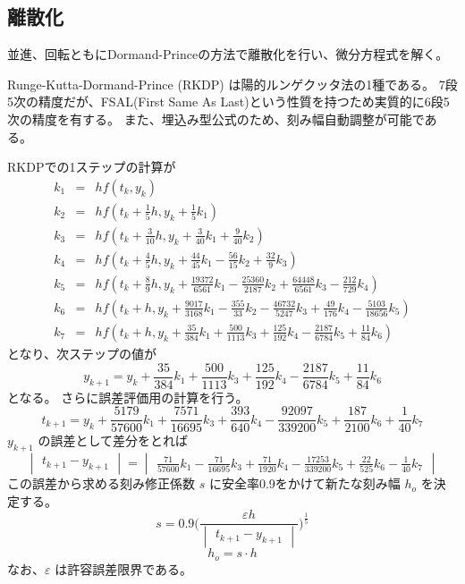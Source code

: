 ﻿\documentclass[a4paper]{jsarticle}
\begin{document}
\subsection{離散化}
並進、回転ともにDormand-Princeの方法で離散化を行い、微分方程式を解く。

Runge-Kutta-Dormand-Prince (RKDP) は陽的ルンゲクッタ法の1種である。
7段5次の精度だが、FSAL(First Same As Last)という性質を持つため実質的に6段5次の精度を有する。
また、埋込み型公式のため、刻み幅自動調整が可能である。

RKDPでの1ステップの計算が
\begin{eqnarray}
k_1 &=& hf(t_k, y_k) \\
k_2 &=& hf(t_k + \frac{1}{5}h, y_k + \frac{1}{5}k_1) \\
k_3 &=& hf(t_k + \frac{3}{10}h, y_k + \frac{3}{40}k_1 + \frac{9}{40}k_2) \\
k_4 &=& hf(t_k + \frac{4}{5}h, y_k + \frac{44}{45}k_1 - \frac{56}{15}k_2 + \frac{32}{9}k_3) \\
k_5 &=& hf(t_k + \frac{8}{9}h, y_k + \frac{19372}{6561}k_1 - \frac{25360}{2187}k_2 + \frac{64448}{6561}k_3 - \frac{212}{729}k_4) \\
k_6 &=& hf(t_k + h, y_k + \frac{9017}{3168}k_1 - \frac{355}{33}k_2 - \frac{46732}{5247}k_3 + \frac{49}{176}k_4 - \frac{5103}{18656}k_5) \\
k_7 &=& hf(t_k + h, y_k + \frac{35}{384}k_1 + \frac{500}{1113}k_3 + \frac{125}{192}k_4 - \frac{2187}{6784}k_5 + \frac{11}{84}k_6) 
\end{eqnarray}
となり、次ステップの値が
\begin{equation}
y_{k+1} = y_k + \frac{35}{384}k_1 + \frac{500}{1113}k_3 + \frac{125}{192}k_4 - \frac{2187}{6784}k_5 + \frac{11}{84}k_6
\end{equation}
となる。
さらに誤差評価用の計算を行う。
\begin{equation}
t_{k+1} = y_k + \frac{5179}{57600}k_1 + \frac{7571}{16695}k_3 + \frac{393}{640}k_4 - \frac{92097}{339200}k_5 + \frac{187}{2100}k_6 + \frac{1}{40}k_7
\end{equation}
$y_{k+1}$ の誤差として差分をとれば
\begin{equation}
\begin{vmatrix}t_{k+1} - y_{k+1}\end{vmatrix} = 
\begin{vmatrix}
\frac{71}{57600}k_1
- \frac{71}{16695}k_3
+ \frac{71}{1920}k_4
- \frac{17253}{339200}k_5
+ \frac{22}{525}k_6
- \frac{1}{40}k_7
\end{vmatrix}
\end{equation}
この誤差から求める刻み修正係数 $s$ に安全率0.9をかけて新たな刻み幅 $h_o$ を決定する。
\begin{equation}
s = 0.9 \biggl(\frac{\varepsilon h}{\begin{vmatrix}t_{k+1} - y_{k+1}\end{vmatrix}}\biggr)^\frac{1}{5}
\end{equation}
\begin{equation}
h_o = s \cdot h
\end{equation}
なお、$\varepsilon$ は許容誤差限界である。
\end{document}
